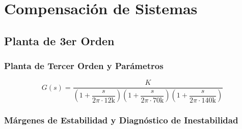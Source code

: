 
\section{Compensación de Sistemas}
\subsection{Planta de 3er Orden}
\begin{frame}
  \frametitle{Planta de Tercer Orden y Parámetros}

  \vfill
  \centering
  \begin{tarjeta}[width=0.85\textwidth, top=16pt, bottom=16pt]
    \centering
    {\large
    \[
      G(s) = \frac{K}{\left(1 + \dfrac{s}{2\pi \cdot 12\text{k}}\right)\left(1 + \dfrac{s}{2\pi \cdot 70\text{k}}\right)\left(1 + \dfrac{s}{2\pi \cdot 140\text{k}}\right)}
    \]
    }
  \end{tarjeta}
  \vfill
\end{frame}

\begin{frame}
  \frametitle{Márgenes de Estabilidad y Diagnóstico de Inestabilidad}

  \centering
\end{frame}

